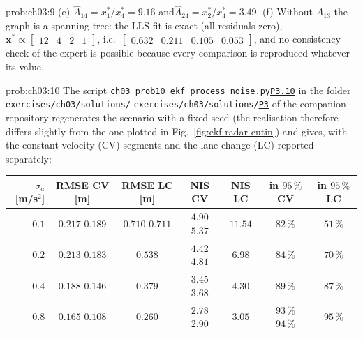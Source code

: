 \documentclass[graybox,envcountchap]{style/SNmono}
\newcommand{\repopath}[1]{\texttt{#1}}
\providecommand{\DIFadd}[1]{{\protect\color{blue} #1}} %
\providecommand{\DIFdel}[1]{{\protect\color{red} #1}} %
\providecommand{\DIFaddbegin}{} %
\providecommand{\DIFaddend}{} %
\providecommand{\DIFdelbegin}{} %
\providecommand{\DIFdelend}{} %
\DeclareRobustCommand{\RtwoDel}[1]{{\color{red}%
  \renewcommand{\DIFadd}[1]{##1}\renewcommand{\DIFdel}[1]{##1}%
  #1}}
\DeclareRobustCommand{\RtwoAdd}[1]{{\color{blue}#1}}
\DeclareRobustCommand{\codeentry}[1]{\hyperref[code:#1]{\texttt{#1}}}
\begin{document}
\begin{sol}{prob:ch03:9}
(e) $\widehat{A}_{14}=x_1^{*}/x_4^{*}=9.16$ and\DIFaddbegin \allowbreak \DIFaddend $\widehat{A}_{24}=x_2^{*}/x_4^{*}=3.49$.
(f) Without $A_{13}$ the graph is a spanning tree: the LLS fit is exact (all residuals zero), $\bm{x}^{*}\propto\begin{bmatrix}12&4&2&1\end{bmatrix}$, i.e.\ $\begin{bmatrix}0.632&0.211&0.105&0.053\end{bmatrix}$, and no consistency check of the expert is possible because every comparison is reproduced whatever its value.
\end{sol}

\begin{sol}{prob:ch03:10}
The script \RtwoDel{\repopath{ch03\_\allowbreak prob10\_\allowbreak ekf\_\allowbreak process\_\allowbreak noise.py}}\RtwoAdd{\codeentry{P3.10}} in the folder \DIFdelbegin \DIFdel{\repopath{exercises/\allowbreak ch03/\allowbreak solutions/} }\DIFdelend \DIFaddbegin \DIFadd{\RtwoDel{\repopath{exercises/\allowbreak ch03/\allowbreak solutions/\allowbreak }}\RtwoAdd{\codeentry{P3}} }\DIFaddend of the companion repository regenerates the scenario with a fixed seed (the realisation therefore differs slightly from the one plotted in Fig.~\ref{fig:ekf-radar-cutin}) and gives, with the constant-velocity (CV) segments and the lane change (LC) reported separately:
\begin{center}
\footnotesize
\setlength{\tabcolsep}{4pt}
\begin{tabular}{r cc cc cc}
\hline
$\sigma_a$ [m/s$^{2}$] & RMSE CV [m] & RMSE LC [m] & NIS CV & NIS LC & in $95\,\%$ CV & in $95\,\%$ LC\\
\hline
$0.1$ & \DIFdelbegin \DIFdel{$0.217$ }\DIFdelend \DIFaddbegin \DIFadd{$0.189$ }\DIFaddend & \DIFdelbegin \DIFdel{$0.710$ }\DIFdelend \DIFaddbegin \DIFadd{$0.711$ }\DIFaddend & \DIFdelbegin \DIFdel{$4.90$ }\DIFdelend \DIFaddbegin \DIFadd{$5.37$ }\DIFaddend & $11.54$ & $82\,\%$ & $51\,\%$\\
$0.2$ & \DIFdelbegin \DIFdel{$0.213$ }\DIFdelend \DIFaddbegin \DIFadd{$0.183$ }\DIFaddend & $0.538$ & \DIFdelbegin \DIFdel{$4.42$ }\DIFdelend \DIFaddbegin \DIFadd{$4.81$ }\DIFaddend & $6.98$ & $84\,\%$ & $70\,\%$\\
$0.4$ & \DIFdelbegin \DIFdel{$0.188$ }\DIFdelend \DIFaddbegin \DIFadd{$0.146$ }\DIFaddend & $0.379$ & \DIFdelbegin \DIFdel{$3.45$ }\DIFdelend \DIFaddbegin \DIFadd{$3.68$ }\DIFaddend & $4.30$ & $89\,\%$ & $87\,\%$\\
$0.8$ & \DIFdelbegin \DIFdel{$0.165$ }\DIFdelend \DIFaddbegin \DIFadd{$0.108$ }\DIFaddend & $0.260$ & \DIFdelbegin \DIFdel{$2.78$ }\DIFdelend \DIFaddbegin \DIFadd{$2.90$ }\DIFaddend & $3.05$ & \DIFdelbegin \DIFdel{$93\,\%$ }\DIFdelend \DIFaddbegin \DIFadd{$94\,\%$ }\DIFaddend & $95\,\%$\\

\end{tabular}
\end{center}
\end{sol}
\end{document}
